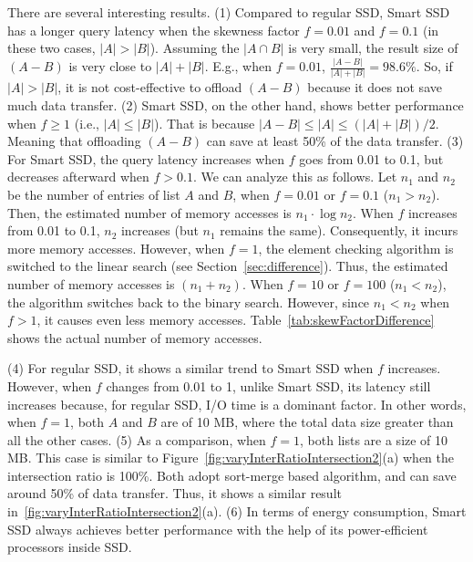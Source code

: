 There are several interesting results.
(1) Compared to regular SSD, Smart SSD has a longer query latency when the skewness factor $f=0.01$ and $f=0.1$ (in these two cases, $|A| > |B|$). Assuming the $|A\cap B|$ is very small, the result size of $(A-B)$ is very close to $|A| + |B|$. E.g., when $f=0.01$, $\frac{|A-B|}{|A| + |B|}=98.6\%$. So, if $|A| > |B|$, it is not cost-effective to offload $(A-B)$ because it does not save much data transfer.
(2) Smart SSD, on the other hand, shows better performance when $f\ge 1$ (i.e., $|A| \le |B|$). That is because $|A-B| \le |A| \le (|A| + |B|)/2$. Meaning that offloading $(A-B)$ can save at least 50\% of the data transfer.
(3) For Smart SSD, the query latency increases when $f$ goes from 0.01 to 0.1, but decreases afterward when $f>0.1$. 
We can analyze this as follows. Let $n_1$ and $n_2$ be the number of entries of list $A$ and $B$, when $f=0.01$ or $f=0.1$ ($n_1>n_2$). Then, the estimated number of memory accesses is $n_1\cdot\log n_2$. When $f$ increases from 0.01 to 0.1, $n_2$ increases (but $n_1$ remains the same). Consequently, it incurs more memory accesses. However, when $f=1$, the element checking algorithm is switched to the linear search (see Section~\ref{sec:difference}). Thus, the estimated number of memory accesses is $(n_1 + n_2)$. When $f=10$ or $f=100$ ($n_1<n_2$), the algorithm switches back to the binary search. However, since $n_1<n_2$ when $f>1$, it causes even less memory accesses. Table~\ref{tab:skewFactorDifference} shows the actual number of memory accesses.


(4) For regular SSD, it shows a similar trend to Smart SSD when $f$ increases. However, when $f$ changes from 0.01 to 1, unlike Smart SSD, its latency still increases because, for regular SSD, I/O time is a dominant factor. In other words, when $f=1$, both $A$ and $B$ are of 10 MB, where the total data size greater than all the other cases.
(5) As a comparison, when $f=1$, both lists are a size of 10 MB. This case is similar to Figure~\ref{fig:varyInterRatioIntersection2}(a) when the intersection ratio is 100\%. Both adopt sort-merge based algorithm, and can save around 50\% of data transfer. Thus, it shows a similar result in~\ref{fig:varyInterRatioIntersection2}(a).
(6) In terms of energy consumption, Smart SSD always achieves better performance with the help of its power-efficient processors inside SSD.

